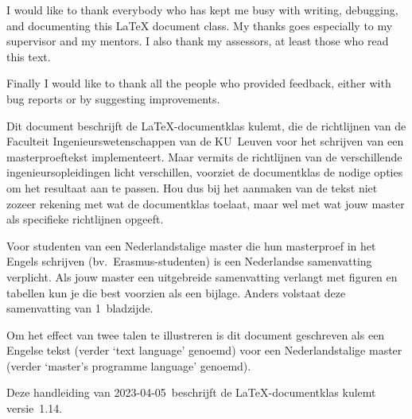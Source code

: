 \documentclass[master=elt,masteroption=im,english,oneside]{kulemt}
\newcommand*\classversion{1.14}
\newcommand*\manualdate{2023-04-05}
\newcommand*\cls[1]{\textsf{#1}}
\newcommand\English[1]{`\foreignlanguage{english}{#1}'}
\begin{document}
\begin{preface}
  I would like to thank everybody who has kept me busy with writing,
  debugging, and documenting this LaTeX document class. My thanks goes
  especially to my supervisor and my mentors. I also thank my assessors,
  at least those who read this text.

  Finally I would like to thank all the people who provided feedback,
  either with bug reports or by suggesting improvements.
\end{preface}

\tableofcontents*

\begin{abstract}
  This document describes the use of the LaTeX document class \cls{kulemt},
  which implements the KU~Leuven Faculty of Engineering guidelines for writing
  a master's thesis. Since there are slight differences between the actual
  guidelines of the different engineering master's programmes, this class
  implements not only the common part, but it also provides the necessary
  options to adapt it to the specific requirements. So please check the
  guidelines of your master's programme before using or tweaking typesetting
  options.

  To illustrate the difference between the main text language and the master's
  programme language, this document is written in English (as the main text
  language) for a Dutch master's programme.

  This manual (dated \manualdate) describes the \cls{kulemt} class
  version~\classversion.
\end{abstract}

\begin{abstract*}
  Dit document beschrijft de LaTeX-documentklas \cls{kulemt}, die de
  richtlijnen van de Faculteit Ingenieurswetenschappen van de KU~Leuven
  voor het schrijven van een masterproeftekst implementeert. Maar vermits
  de richtlijnen van de verschillende ingenieursopleidingen licht
  verschillen, voorziet de documentklas de nodige opties om het resultaat
  aan te passen. Hou dus bij het aanmaken van de tekst niet zozeer rekening
  met wat de documentklas toelaat, maar wel met wat jouw master als
  specifieke richtlijnen opgeeft.

  Voor studenten van een Nederlandstalige master die hun masterproef in het
  Engels schrijven (bv.\ Erasmus-studenten) is een Nederlandse samenvatting
  verplicht. Als jouw master een uitgebreide samenvatting verlangt met
  figuren en tabellen kun je die best voorzien als een bijlage. Anders
  volstaat deze samenvatting van 1~bladzijde.

  Om het effect van twee talen te illustreren is dit document geschreven
  als een Engelse tekst (verder \English{text language} genoemd) voor een
  Nederlandstalige master (verder \English{master's programme language}
  genoemd).

  Deze handleiding van \manualdate\ beschrijft de LaTeX-documentklas
  \cls{kulemt} versie~\classversion.
\end{abstract*}
\end{document}
